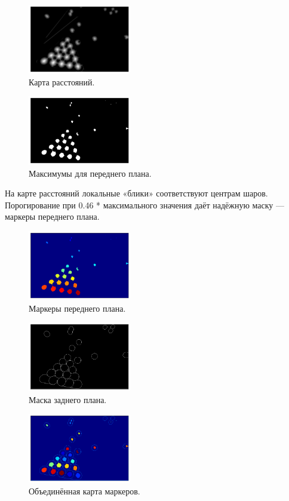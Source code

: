 \documentclass[a4paper,12pt]{article}
\begin{document}
\begin{figure}[H]
    \centering
    \includegraphics[width=0.4\textwidth]{result/3_distance.png}
    \caption{Карта расстояний.}
\end{figure}
\begin{figure}[H]
    \centering
    \includegraphics[width=0.4\textwidth]{result/3_fg.png}
    \caption{Максимумы для переднего плана.}
\end{figure}

На карте расстояний локальные «блики» соответствуют центрам шаров. Порогирование при 0.46 * максимального значения даёт надёжную маску — маркеры переднего плана.

\begin{figure}[H]
    \centering
    \includegraphics[width=0.4\textwidth]{result/3_fg_markers.png}
    \caption{Маркеры переднего плана.}
\end{figure}
\begin{figure}[H]
    \centering
    \includegraphics[width=0.4\textwidth]{result/3_bg.png}
    \caption{Маска заднего плана.}
\end{figure}
\begin{figure}[H]
    \centering
    \includegraphics[width=0.4\textwidth]{result/3_all_markers.png}
    \caption{Объединённая карта маркеров.}
\end{figure}
\end{document}
